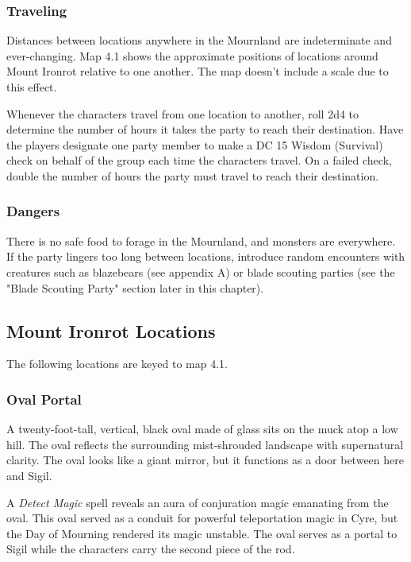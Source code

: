 \documentclass[10pt,a4paper,twoside,bg=print,twocolumn,openany,nodeprecatedcode]{dndbook}
\begin{document}
\subsubsection{Traveling}
Distances between locations anywhere in the Mournland are indeterminate and ever-changing. Map 4.1 shows the approximate positions of locations around Mount Ironrot relative to one another. The map doesn't include a scale due to this effect.

Whenever the characters travel from one location to another, roll 2d4 to determine the number of hours it takes the party to reach their destination. Have the players designate one party member to make a DC 15 Wisdom (Survival) check on behalf of the group each time the characters travel. On a failed check, double the number of hours the party must travel to reach their destination.

\subsubsection{Dangers}
There is no safe food to forage in the Mournland, and monsters are everywhere. If the party lingers too long between locations, introduce random encounters with creatures such as blazebears (see appendix A) or blade scouting parties (see the "Blade Scouting Party" section later in this chapter).

\subsection{Mount Ironrot Locations}
The following locations are keyed to map 4.1.

\subsubsection{Oval Portal}
\begin{DndReadAloud}{}
A twenty-foot-tall, vertical, black oval made of glass sits on the muck atop a low hill. The oval reflects the surrounding mist-shrouded landscape with supernatural clarity. The oval looks like a giant mirror, but it functions as a door between here and Sigil.

\end{DndReadAloud}

A \textit{Detect Magic} spell reveals an aura of conjuration magic emanating from the oval. This oval served as a conduit for powerful teleportation magic in Cyre, but the Day of Mourning rendered its magic unstable. The oval serves as a portal to Sigil while the characters carry the second piece of the rod.
\end{document}
